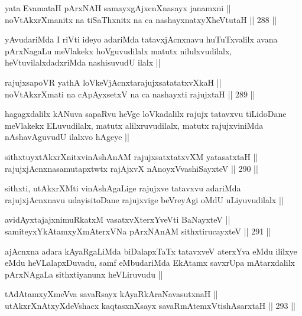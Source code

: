 \begin{shl}
yata EvamataH pArxNAH samayxgAjxcnXnasayx janamxni || \\
noVtAkxrXmanitx na tiSaThxnitx na ca nashayxnatxyXheVtutaH ||  288 ||  
\end{shl}

\begin{artha}
yAvudariMda I riVti ideyo adariMda tatavxjAcnxnavu huTuTxvalilx avana
pArxNagaLu meVlakekx hoVguvudilalx matutx nilulxvudilalx,
heVtuvilalxdadxriMda nashisuvudU ilalx ||
\end{artha}

\begin{shl}
rajujxsapoVR yathA loVkeV\s jAcnxtarajujxsatatatxvXkaH || \\
noVtAkxrXmati na cApAyxsetxV na ca nashayxti rajujxtaH ||  289 ||  
\end{shl}

\begin{artha}
hagagxdalilx kANuva sapaRvu heVge loVkadalilx rajujx tatavxvu
tiLidoDane meVlakekx ELuvudilalx, matutx alilxruvudilalx, matutx
rajujxviniMda nAshavAguvudU ilalxvo hAgeye ||
\end{artha}

\begin{shl}
sithxtuyxtAkxrXnitxvinAshAnAM rajujxsatxtatxvXM yatasatxtaH || \\
rajujxjAcnxnasamutapxtwtx rajAjxvX nAnoyxV\s vashiSayxteV ||  290 ||  
\end{shl}

\begin{artha}
sithxti, utAkxrXMti vinAshAgaLige rajujxve tatavxvu adariMda
rajujxjAcnxnavu udayisitoDane rajujxvige beVreyAgi oMdU uLiyuvudilalx ||
\end{artha}


\begin{shl}
avidAyxtajajxnimuRkatxM vasatxvXterxYveVti BaNayxteV || \\
samiteyxYkAtamxyXmAterxVNa pArxNAnAM sithxtirucayxteV ||  291 ||  
\end{shl}	

\begin{artha}
ajAcnxna adara kAyaRgaLiMda biDalapxTaTx tatavxveV aterxYva eMdu
ililxye eMdu heVLalapxDuvadu, samf eMbudariMda EkAtamx savxrUpa
mAtarxdalilx pArxNAgaLa sithxtiyanunx heVLiruvudu ||
\end{artha}

\begin{shl}
tAdAtamxyXmeVva savaRsayx kAyaRkAraNavasutxnaH || \\
utAkxrXnAtxyXdeVshacx kaqtasxnXsayx savaRmAtemxVtishAsarxtaH ||  293 ||  
\end{shl}

